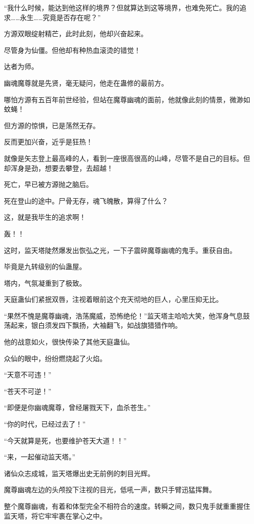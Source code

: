 \begin{this_body}
“我什么时候，能达到他这样的境界？但就算达到这等境界，也难免死亡。我的追求……永生……究竟是否存在呢？”

方源双眼绽射精芒，此时此刻，他却兴奋起来。

尽管身为仙僵。但他却有种热血滚烫的错觉！

达者为师。

幽魂魔尊就是先贤，毫无疑问，他走在蛊修的最前方。

哪怕方源有五百年前世经验，但站在魔尊幽魂的面前，他就像此刻的情景，微渺如蚊蝇！

但方源的惊惧，已是荡然无存。

反而更加兴奋，近乎是狂热！

就像是矢志登上最高峰的人，看到一座很高很高的山峰，尽管不是自己的目标。但却浑身是劲，想要去攀登，去超越！

死亡，早已被方源抛之脑后。

死在登山的途中。尸骨无存，魂飞魄散，算得了什么？

这，就是我毕生的追求啊！

轰！！

这时，监天塔陡然爆发出恢弘之光，一下子震碎魔尊幽魂的鬼手。重获自由。

毕竟是九转级别的仙蛊屋。

塔内，气氛凝重到了极致。

天庭蛊仙们紧抿双唇，注视着眼前这个充天彻地的巨人，心里压抑无比。

“果然不愧是魔尊幽魂，浩荡魔威，恐怖绝伦！”监天塔主哈哈大笑，他浑身气息鼓荡起来，银白须发四下飘扬，大袖翻飞，如战旗猎猎作响。

他的战意如火，很快传染了其他天庭蛊仙。

众仙的眼中，纷纷燃烧起了火焰。

“天意不可违！”

“苍天不可逆！”

“即便是你幽魂魔尊，曾经屠戮天下，血杀苍生。”

“你的时代，已经过去了！”

“今天就算是死，也要维护苍天大道！！”

“来，一起催动监天塔。”

诸仙众志成城，监天塔爆出史无前例的刺目光辉。

魔尊幽魂左边的头颅投下注视的目光，低吼一声，数只手臂迅猛挥舞。

整个魔尊幽魂，有着和体型完全不相符合的速度。转瞬之间，数只鬼手就重重握住监天塔，将它牢牢裹在掌心之中。


\end{this_body}
